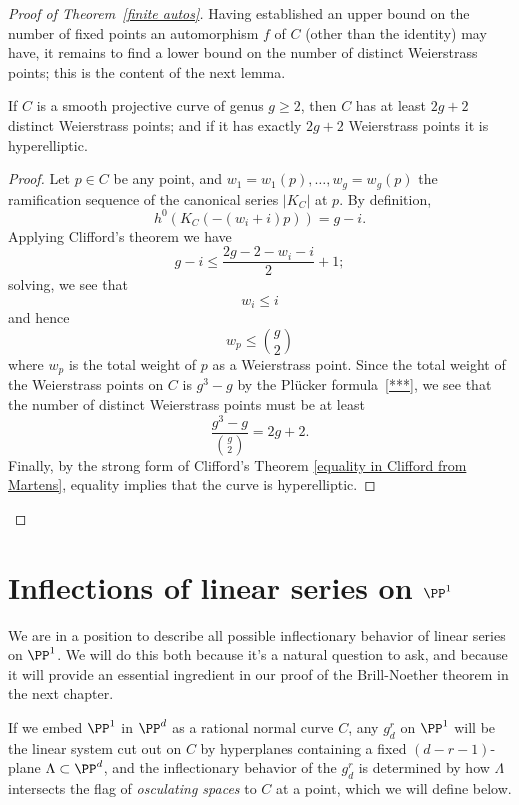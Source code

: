 \begin{proof}[Proof of Theorem~\ref{finite autos}]
Having established an upper  bound on the number of fixed points an automorphism $f$ of $C$ (other than the identity) may have, it remains to find a lower bound on the number of distinct Weierstrass points; this is the content of the next lemma.


\begin{lemma}
If $C$ is a smooth projective curve of genus $g \geq 2$, then $C$ has at least $2g+2$ distinct Weierstrass points; and if it has exactly $2g+2$ Weierstrass points it is hyperelliptic.
\end{lemma}

\begin{proof}
Let $p \in C$ be any point, and $w_1=w_1(p),\dots,w_g = w_g(p)$ the ramification sequence of the canonical series $|K_C|$ at $p$. By definition, 
$$
h^0(K_C(-(w_i+i)p)) = g - i.
$$
Applying Clifford's theorem we have
$$
g-i \leq \frac{2g - 2 - w_i - i}{2} + 1;
$$
solving, we see that
$$
w_i \leq i
$$
and hence
$$
w_p \leq \binom{g}{2}
$$
where $w_p$ is the total weight of $p$ as a Weierstrass point. Since the total weight of the Weierstrass points on $C$ is $g^3-g$ by the Pl\"ucker formula~\ref{***}, we see that the number of distinct Weierstrass points must be at least
$$
\frac{g^3-g}{\binom{g}{2}} = 2g+2.
$$
Finally, by the strong form of Clifford's Theorem \ref{equality in Clifford from Martens}, equality implies that the curve is hyperelliptic.\end{proof}


\end{proof}

\section{Inflections of linear series on $\PP^1$}

We are in a position to describe all possible inflectionary behavior of linear series on $\PP^1$. We will do this both because it's a natural question to ask, and because it will provide an essential ingredient in our proof of the Brill-Noether theorem in the next chapter.

If we embed $\PP^1$ in $\PP^d$ as a rational normal curve $C$, any $g^r_d$ on $\PP^1$ will be the linear system cut out on $C$ by hyperplanes containing a fixed $(d-r-1)$-plane $\Lambda \subset \PP^d$, and the inflectionary behavior of the $g^r_d$ is determined by how $\Lambda$ intersects the flag of \emph{osculating spaces}  to $C$ at a point, which we will define below. 

